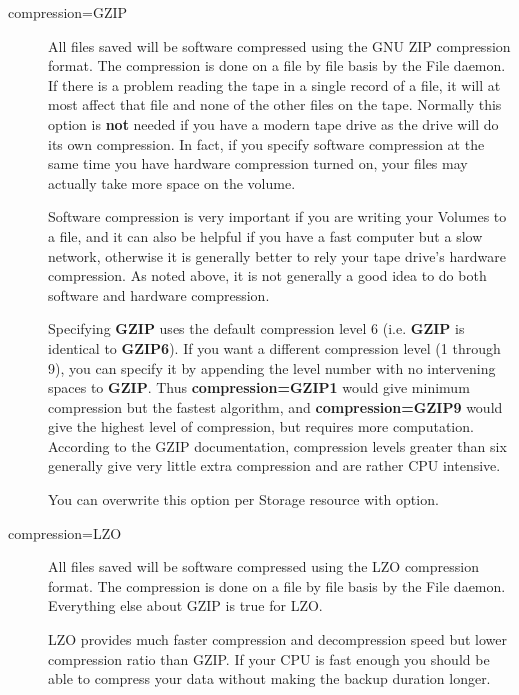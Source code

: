 \begin{description}

\item [compression=GZIP]
   All files saved will be software compressed using the GNU ZIP
   compression format.  The compression is done on a file by file basis by
   the File daemon.  If there is a problem reading the tape in a single
   record of a file, it will at most affect that file and none of the other
   files on the tape.  Normally this option is {\bf not} needed if you have
   a modern tape drive as the drive will do its own compression.  In fact,
   if you specify software compression at the same time you have hardware
   compression turned on, your files may actually take more space on the
   volume.

   Software compression is very important if you are writing your Volumes
   to a file, and it can also be helpful if you have a fast computer but a
   slow network, otherwise it is generally better to rely your tape drive's
   hardware compression.  As noted above, it is not generally a good idea
   to do both software and hardware compression.

   Specifying {\bf GZIP} uses the default compression level 6 (i.e.  {\bf
   GZIP} is identical to {\bf GZIP6}).  If you want a different compression
   level (1 through 9), you can specify it by appending the level number
   with no intervening spaces to {\bf GZIP}.  Thus {\bf compression=GZIP1}
   would give minimum compression but the fastest algorithm, and {\bf
   compression=GZIP9} would give the highest level of compression, but
   requires more computation.  According to the GZIP documentation,
   compression levels greater than six generally give very little extra
   compression and are rather CPU intensive.

   You can overwrite this option per Storage resource with
    option.

\item [compression=LZO]
   All files saved will be software compressed using the LZO
   compression format. The compression is done on a file by file basis by
   the File daemon. Everything else about GZIP is true for LZO.

   LZO provides much faster compression and decompression speed but lower
   compression ratio than GZIP. If your CPU is fast enough you should be able
   to compress your data without making the backup duration longer.


\end{description}
